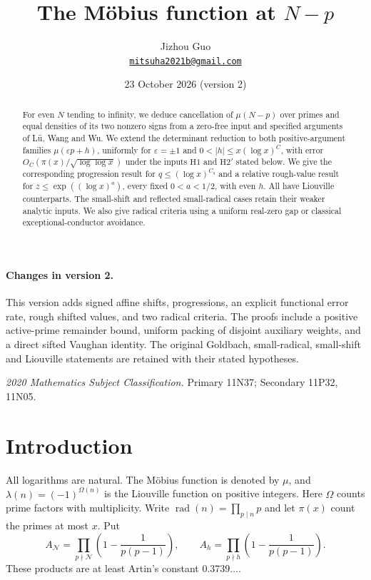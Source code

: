 \documentclass[11pt]{article}
\title{The M\"obius function at $N-p$}
\author{Jizhou Guo\\
  \href{mailto:mitsuha2021b@gmail.com}{\texttt{mitsuha2021b@gmail.com}}}
\date{23 October 2026 (version 2)}
\theoremstyle{definition}
\DeclareMathOperator{\rad}{rad}
\newcommand{\GN}{\mathcal N}
\theoremstyle{remark}
\numberwithin{equation}{section}
\begin{document}
\maketitle
\begin{abstract}
For even $N$ tending to infinity, we deduce cancellation of $\mu(N-p)$
over primes and equal densities of its two nonzero signs from a
zero-free input and specified arguments of L\"u, Wang and Wu.
We extend the determinant reduction to both positive-argument families
$\mu(\varepsilon p+h)$, uniformly for $\varepsilon=\pm1$ and
$0<|h|\le x(\log x)^C$, with error
$O_C(\pi(x)/\sqrt{\log\log x})$ under the inputs
$\mathrm H1$ and $\mathrm H2'$ stated below.
We give the corresponding progression result for
$q\le(\log x)^{C_q}$ and a relative rough-value result for
$z\le\exp((\log x)^a)$, every fixed $0<a<1/2$, with even $h$.
All have Liouville counterparts. The small-shift and reflected
small-radical cases retain their weaker analytic inputs.
We also give radical criteria using a uniform real-zero gap or
classical exceptional-conductor avoidance.
\end{abstract}
\paragraph{Changes in version 2.}
This version adds signed affine shifts, progressions, an explicit
functional error rate, rough shifted values, and two radical criteria.
The proofs include a positive active-prime remainder bound, uniform
packing of disjoint auxiliary weights, and a direct sifted Vaughan
identity. The original Goldbach, small-radical, small-shift and
Liouville statements are retained with their stated hypotheses.

\noindent\textit{2020 Mathematics Subject Classification.}
Primary 11N37; Secondary 11P32, 11N05.

\section{Introduction}\label{sec:intro}
All logarithms are natural. The M\"obius function is denoted by $\mu$,
and $\lambda(n)=(-1)^{\Omega(n)}$ is the Liouville function on positive
integers. Here $\Omega$ counts prime factors with multiplicity.
Write $\rad(n)=\prod_{p\mid n}p$ and let $\pi(x)$ count the primes at
most $x$. Put
\begin{equation}\label{eq:squarefree-product}
 A_{\GN}=\prod_{p\nmid\GN}\left(1-\frac1{p(p-1)}\right),\qquad
 A_h=\prod_{p\nmid h}\left(1-\frac1{p(p-1)}\right).
\end{equation}
These products are at least Artin's constant $0.3739\ldots$.
\end{document}
